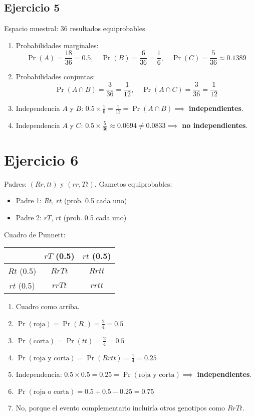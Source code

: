 \documentclass{article}
\begin{document}
	\subsection*{Ejercicio 5}
	Espacio muestral: 36 resultados equiprobables.
	\begin{enumerate}[label=\alph*)]
		\item Probabilidades marginales:
		\[
		\Pr(A) = \frac{18}{36} = 0.5, \quad \Pr(B) = \frac{6}{36} = \frac{1}{6}, \quad \Pr(C) = \frac{5}{36} \approx 0.1389
		\]
		
		\item Probabilidades conjuntas:
		\[
		\Pr(A \cap B) = \frac{3}{36} = \frac{1}{12}, \quad \Pr(A \cap C) = \frac{3}{36} = \frac{1}{12}
		\]
		
		\item Independencia \( A \) y \( B \): \( 0.5 \times \frac{1}{6} = \frac{1}{12} = \Pr(A \cap B) \implies \) \textbf{independientes}.
		
		\item Independencia \( A \) y \( C \): \( 0.5 \times \frac{5}{36} \approx 0.0694 \neq 0.0833 \implies \) \textbf{no independientes}.
	\end{enumerate}
	
	\section*{Ejercicio 6}
	Padres: \( (Rr, tt) \) y \( (rr, Tt) \). Gametos equiprobables:
	\begin{itemize}
		\item Padre 1: \( Rt \), \( rt \) (prob. 0.5 cada uno)
		\item Padre 2: \( rT \), \( rt \) (prob. 0.5 cada uno)
	\end{itemize}
	
	Cuadro de Punnett:
	\begin{center}
		\begin{tabular}{c|c|c}
			& \( rT \) (0.5) & \( rt \) (0.5) \\
			\hline
			\( Rt \) (0.5) & \( RrTt \) & \( Rrtt \) \\
			\hline
			\( rt \) (0.5) & \( rrTt \) & \( rrtt \) \\
		\end{tabular}
	\end{center}
	
	\begin{enumerate}[label=\alph*)]
		\item Cuadro como arriba.
		\item \( \Pr(\text{roja}) = \Pr(R\_) = \frac{2}{4} = 0.5 \)
		\item \( \Pr(\text{corta}) = \Pr(tt) = \frac{2}{4} = 0.5 \)
		\item \( \Pr(\text{roja y corta}) = \Pr(Rrtt) = \frac{1}{4} = 0.25 \)
		\item Independencia: \( 0.5 \times 0.5 = 0.25 = \Pr(\text{roja y corta}) \implies \) \textbf{independientes}.
		\item \( \Pr(\text{roja o corta}) = 0.5 + 0.5 - 0.25 = 0.75 \)
		\item No, porque el evento complementario incluiría otros genotipos como \( RrTt \).
	\end{enumerate}
	
\end{document}
